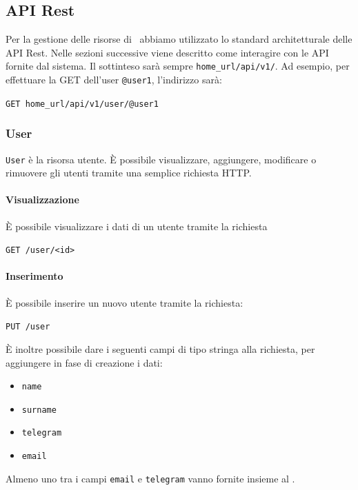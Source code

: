 \subsection{API Rest}\label{APIRest}
\newcommand{\homeUrl}{home\_url}

Per la gestione delle risorse di \progetto\ abbiamo utilizzato lo standard architetturale delle API Rest.
Nelle sezioni successive viene descritto come interagire con le API fornite dal sistema.
Il  sottinteso sarà sempre \texttt{\homeUrl/api/v1/}.
Ad esempio, per effettuare la GET dell'user \texttt{@user1}, l'indirizzo sarà:
\begin{center}
    \texttt{GET \homeUrl/api/v1/user/@user1}
\end{center}

\subsubsection{User}

\texttt{User} è la risorsa utente.
È possibile visualizzare, aggiungere, modificare o rimuovere gli utenti tramite una semplice
richiesta HTTP.

\paragraph{Visualizzazione}
È possibile visualizzare i dati di un utente tramite la richiesta
    \begin{center}
        \texttt{GET  /user/<id>}
    \end{center}

\paragraph{Inserimento}
È possibile inserire un nuovo utente tramite la richiesta:
    \begin{center}
        \texttt{PUT /user}
    \end{center}

È inoltre possibile dare i seguenti campi di tipo stringa alla richiesta, per aggiungere in fase di creazione i dati:
\begin{itemize}[noitemsep]
    \item \texttt{name}
    \item \texttt{surname}
    \item \texttt{telegram}
    \item \texttt{email}
\end{itemize}
Almeno uno tra i campi \texttt{email} e \texttt{telegram} vanno fornite insieme al .

